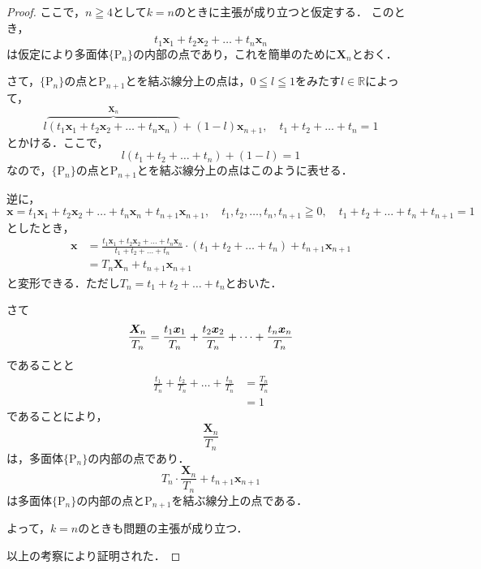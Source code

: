 \documentclass[a4paper,10pt,fleqn]{ltjsarticle}
\begin{document}
\begin{leftbar}
\begin{proof}
        ここで，$n \geqq 4$として$k=n$のときに主張が成り立つと仮定する．
        このとき，
        \[
            t_1 \bm{x}_1 + t_2 \bm{x}_2+\dots+ t_n \bm{x}_n
        \]
        は仮定により多面体$\{ \mathrm{P}_n \}$の内部の点であり，これを簡単のために$\bm{X}_n$とおく．

        さて，$\{ \mathrm{P}_n \}$の点と$\mathrm{P}_{n+1}$とを結ぶ線分上の点は，$ 0 \leqq l \leqq 1$をみたす$l \in \mathbb{R}$によって，
        \[
            l \overbrace{(  t_1 \bm{x}_1 + t_2 \bm{x}_2+\dots+ t_n \bm{x}_n)}^{\bm{X}_n}+(1-l) \bm{x}_{n+1} , \quad t_1+t_2+\dots + t_n =1
        \]
        とかける．ここで，
        \[
            l(t_1+t_2+\dots+t_n)+(1-l)=1
        \]
        なので，$\{ \mathrm{P}_n \}$の点と$\mathrm{P}_{n+1}$とを結ぶ線分上の点はこのように表せる．

        逆に，
        \[
            \bm{x} = t_1 \bm{x}_1 + t_2 \bm{x}_2 + \dots + t_n \bm{x}_n + t_{n+1} \bm{x}_{n+1} , \quad t_1, t_2 ,\dots , t_n,t_{n+1} \geqq 0 ,\quad  t_1 +t_2 + \dots+t_n + t_{n+1} =1
        \]
        としたとき，
        \begin{align*}
            \bm{x} & =\frac{t_1 \bm{x}_1 + t_2 \bm{x}_2+\dots+ t_n \bm{x}_n}{t_1+t_2+\dots+t_n} \cdot (t_1+t_2+\dots+t_n) +t_{n+1} \bm{x}_{n+1} \\
                   & = T_n \bm{X}_n + t_{n+1} \bm{x}_{n+1}
        \end{align*}
        と変形できる．ただし$T_n = t_1 + t_2 +\dots+t_n$とおいた．

        さて
        \[
            \frac{\bm{X}_n }{T_n} = \frac{t_1 \bm{x}_1 }{T_n}+ \frac{t_2 \bm{x}_2 }{T_n}+\dots +  \frac{t_n \bm{x}_n }{T_n}  \\
        \]
        であることと
        \begin{align*}
            \frac{t_1}{T_n}+\frac{t_2 }{T_n} +\dots +\frac{t_n }{T_n} & = \frac{T_n}{T_n} \\
                                                                      & = 1
        \end{align*}
        であることにより，
        \[
            \frac{\bm{X}_n}{T_n}
        \]
        は，多面体$\{ \mathrm{P}_n \}$の内部の点であり．
        \[
            T_n \cdot \frac{\bm{X}_n}{T_n} + t_{n+1} \bm{x}_{n+1}
        \]
        は多面体$\{ \mathrm{P}_n \}$の内部の点と$\mathrm{P}_{n+1}$を結ぶ線分上の点である．

        よって，$k=n$のときも問題の主張が成り立つ．

        以上の考察により証明された．
    \end{proof}
\end{leftbar}
\end{document}
